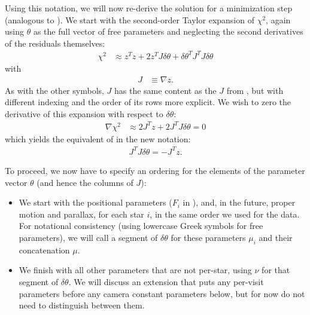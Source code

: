 Using this notation, we will now re-derive the solution for a minimization step (analogous to ).
We start with the second-order Taylor expansion of $\chi^2$, again using $\theta$ as the full vector of free parameters and neglecting the second derivatives of the residuals themselves:
\begin{align}
    \chi^2 &\approx z^Tz + 2z^T J\delta\theta
    + \delta\theta^T J^T\!J \delta\theta
\end{align}
with
\begin{align}
    J &\equiv \nabla z.
\end{align}
As with the other symbols, $J$ has the same content as the $J$ from , but with different indexing and the order of its rows more explicit.
We wish to zero the derivative of this expansion with respect to $\delta\theta$:
\begin{align}
    \nabla\chi^2 &\approx 2J^T\!z + 2J^T\!J \delta\theta = 0
\end{align}
which yields the equivalent of  in the new notation:
\begin{align}
    J^T\!J \delta\theta = -J^T\!z. \label{eq:vp_gradient_equation}
\end{align}

To proceed, we now have to specify an ordering for the elements of the parameter vector $\theta$ (and hence the columns of $J$):
\begin{itemize}
    \item We start with the positional parameters ($F_i$ in ), and, in the future, proper motion and parallax, for each star $i$, in the same order we used for the data.
    For notational consistency (using lowercase Greek symbols for free parameters), we will call a segment of $\delta\theta$ for these parameters $\mu_i$ and their concatenation $\mu$.
    \item We finish with all other parameters that are not per-star, using $\nu$ for that segment of $\delta\theta$.
    We will discuss an extension that puts any per-visit parameters before any camera constant parameters below, but for now do not need to distinguish between them.
\end{itemize}

